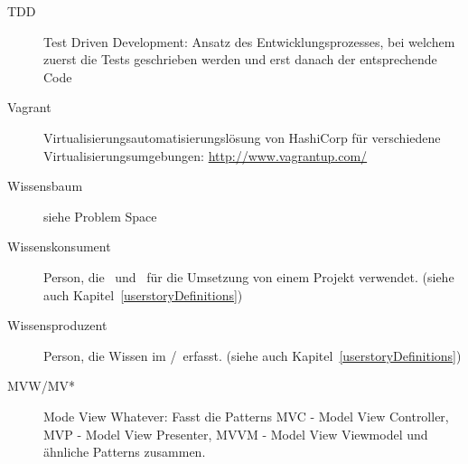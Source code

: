 \begin{description}
		\item[TDD]{Test Driven Development: Ansatz des Entwicklungsprozesses, bei welchem zuerst die Tests geschrieben werden und erst danach der entsprechende Code}
		\item[Vagrant]{Virtualisierungsautomatisierungslösung von HashiCorp für verschiedene Virtualisierungsumgebungen: \url{http://www.vagrantup.com/}}
		\item[Wissensbaum]{siehe Problem Space}
		\item[Wissenskonsument]{Person, die \cdar\ und \eeppi\ für die Umsetzung von einem Projekt verwendet. (siehe auch Kapitel~\ref{userstoryDefinitions})}
		\item[Wissensproduzent]{Person, die Wissen im \cdar/\eeppi\ erfasst. (siehe auch Kapitel~\ref{userstoryDefinitions})}
		\item[MVW/MV*] Mode View Whatever: Fasst die Patterns MVC - Model View Controller, MVP - Model View Presenter, MVVM - Model View Viewmodel und ähnliche Patterns zusammen.
	\end{description}